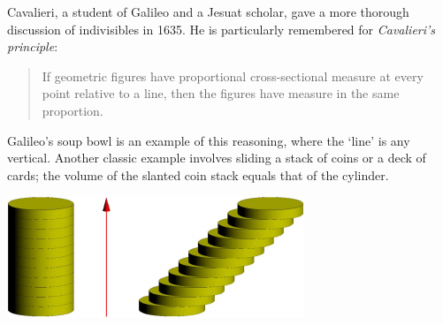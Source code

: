 
Cavalieri, a student of Galileo and a Jesuat scholar, gave a more thorough discussion of indivisibles in 1635. He is particularly remembered for \emph{Cavalieri's principle}:\vspace{-5pt}

\begin{quote}
If geometric figures have proportional cross-sectional measure at every point relative to a line, then the figures have measure in the same proportion.
\end{quote}

\begin{minipage}[t]{0.62\linewidth}\vspace{-10pt}
Galileo's soup bowl is an example of this reasoning, where the `line' is any vertical.\smallbreak
Another classic example involves sliding a stack of coins or a deck of cards; the volume of the slanted coin stack equals that of the cylinder.
\end{minipage}\hfill\begin{minipage}[t]{0.37\linewidth}\vspace{-10pt}
\flushright\includegraphics{analytic-cylinder}
\end{minipage}\medbreak

